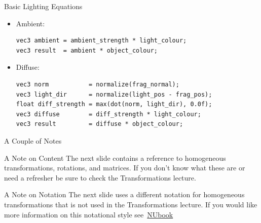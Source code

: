 \documentclass{beamer}
\newcommand{\hrefhand}[2]{\raisebox{-0.4ex}{\HandRight}\,\href{#1}{#2}}
\begin{document}
\begin{frame}[fragile]{Basic Lighting Equations}
    \begin{itemize}
        \item Ambient:
              \footnotesize{
                  \begin{verbatim}
vec3 ambient = ambient_strength * light_colour;
vec3 result  = ambient * object_colour;
\end{verbatim}
              }
        \item Diffuse:
              \footnotesize{
                  \begin{verbatim}
vec3 norm           = normalize(frag_normal);
vec3 light_dir      = normalize(light_pos - frag_pos);
float diff_strength = max(dot(norm, light_dir), 0.0f);
vec3 diffuse        = diff_strength * light_colour;
vec3 result         = diffuse * object_colour;
\end{verbatim}
              }
    \end{itemize}
\end{frame}

\begin{frame}[fragile]{A Couple of Notes}
    \begin{block}{A Note on Content}
        The next slide contains a reference to homogeneous transformations, rotations, and matrices. If you don't know what these are or need a refresher be sure to check the Transformations lecture.
    \end{block}

    \begin{block}{A Note on Notation}
        The next slide uses a different notation for homogeneous transformations that is not used in the Transformations lecture. If you would like more information on this notational style see \hrefhand{https://nubook.nubots.net/system/foundations/mathematics\#homogeneous-transformations}{NUbook}
    \end{block}
\end{frame}
\end{document}
